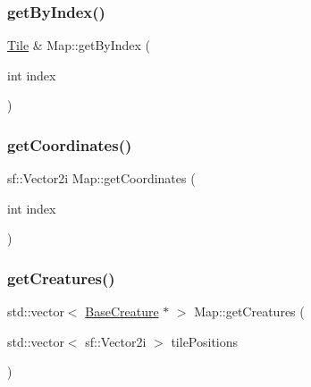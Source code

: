 \subsubsection{\texorpdfstring{get\+By\+Index()}{getByIndex()}}
{\footnotesize\ttfamily \mbox{\hyperlink{class_tile}{Tile}} \& Map\+::get\+By\+Index (\begin{DoxyParamCaption}\item[{int}]{index }\end{DoxyParamCaption})}

\mbox{\label{class_map_abe8292f2baef82f73130f79f6b94f965}} 
\subsubsection{\texorpdfstring{get\+Coordinates()}{getCoordinates()}}
{\footnotesize\ttfamily sf\+::\+Vector2i Map\+::get\+Coordinates (\begin{DoxyParamCaption}\item[{int}]{index }\end{DoxyParamCaption})}

\mbox{\label{class_map_a5b232a4d35b914192077be84d35f3354}} 
\subsubsection{\texorpdfstring{get\+Creatures()}{getCreatures()}}
{\footnotesize\ttfamily std\+::vector$<$ \mbox{\hyperlink{class_base_creature}{Base\+Creature}} $\ast$ $>$ Map\+::get\+Creatures (\begin{DoxyParamCaption}\item[{std\+::vector$<$ sf\+::\+Vector2i $>$}]{tile\+Positions }\end{DoxyParamCaption})}

